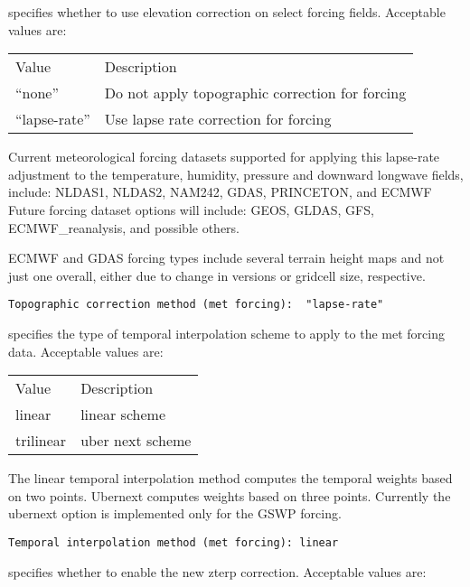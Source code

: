  
  specifies whether
 to use elevation correction on select forcing fields.
 Acceptable values are:

 \begin{tabular}{ll}
 Value & Description                                               \\
 ``none''        & Do not apply topographic correction for forcing \\
 ``lapse-rate''  & Use lapse rate correction for forcing           \\
 \end{tabular}

 Current meteorological forcing datasets supported for applying this
 lapse-rate adjustment to the temperature, humidity, pressure and 
 downward longwave fields, include:
   NLDAS1, NLDAS2, NAM242, GDAS, PRINCETON, and ECMWF
 Future forcing dataset options will include: GEOS, GLDAS, GFS,
 ECMWF\_reanalysis, and possible others.

  ECMWF and GDAS forcing types include several terrain height maps
 and not just one overall, either due to change in versions or
 gridcell size, respective.
 

 \begin{Verbatim}[frame=single]
Topographic correction method (met forcing):  "lapse-rate"
 \end{Verbatim}

 
 specifies the type of temporal interpolation scheme to 
 apply to the met forcing data.
 Acceptable values are:

 \begin{tabular}{ll}
 Value     & Description                      \\
 linear    & linear scheme                    \\
 trilinear & uber next scheme                 \\
 \end{tabular}

 The linear temporal interpolation method computes the temporal weights
 based on two points. Ubernext computes weights based on three points.
 Currently the ubernext option is implemented only for the GSWP forcing.
 

 \begin{Verbatim}[frame=single]
Temporal interpolation method (met forcing): linear
 \end{Verbatim}

 
 specifies whether to enable the new zterp correction.
 Acceptable values are:


